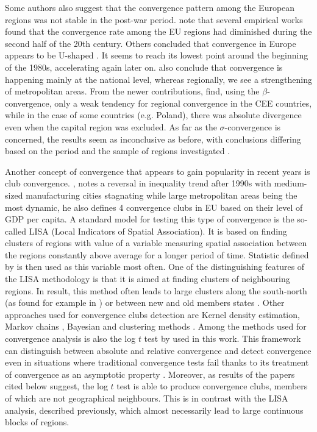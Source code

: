 \documentclass[11pt]{article}
\begin{document}
 Some authors also suggest that the convergence pattern among the European regions was not stable in the post-war period. \citet{eckey2007convergence} note that several empirical works found that the convergence rate among the EU regions had diminished during the second half of the 20th century. Others concluded that convergence in Europe appears to be U-shaped \citep{basile2001regional, geppert2008regional}. It seems to reach its lowest point around the beginning of the 1980s, accelerating again later on. \citet{geppert2008regional} also conclude that convergence is happening mainly at the national level, whereas regionally, we see a strengthening of metropolitan areas. From the newer contributions, \citet*{sme2012regional} find, using the $\beta$-convergence, only a weak tendency for regional convergence in the CEE countries, while in the case of some countries (e.g. Poland), there was absolute divergence even when the capital region was excluded. As far as the $\sigma$-convergence is concerned, the results seem as inconclusive as before, with conclusions differing based on the period and the sample of regions investigated \citep{eckey2007convergence}.
 
 Another concept of convergence that appears to gain popularity in recent years is club convergence. \citet{iammarino2017regional}, notes a reversal in inequality trend after 1990s with medium-sized manufacturing cities stagnating while large metropolitan areas being the most dynamic, he also defines 4 convergence clubs in EU based on their level of GDP per capita.  %
 A standard model for testing this type of convergence is the so-called LISA (Local Indicators of Spatial Association). It is based on finding clusters of regions with value of a variable measuring spatial association between the regions constantly above  average for a longer period of time. Statistic defined by \citet{getis1992analysis} is then used as this variable most often. One of the distinguishing features of the LISA methodology is that it is aimed at finding clusters of neighbouring regions. In result, this method often leads to large clusters along the south-north  (as found for example in \citet{baumont2003spatial}) or between new and old members states \citep{eckey2007convergence}. 
Other approaches used for convergence clubs detection are Kernel density estimation, Markov chains \citep{eckey2007convergence}, Bayesian \citep{fischer2015bayesian} and clustering methods \citep{maasoumi2008economic}. 
Among the methods used for convergence analysis is also the log $t$ test by \citet{phillips2007transition} used in this work. This framework can distinguish between absolute and relative convergence and detect convergence even in situations where traditional convergence tests fail thanks to its treatment of convergence as an asymptotic property \citep{bartkowska2012regional, borsi2015evolution}.
Moreover, as results of the papers cited below suggest, the log $t$ test is able to produce convergence clubs, members of which are not geographical neighbours. This is in contrast with the LISA analysis, described previously, which almost necessarily lead to large continuous blocks of regions.
\end{document}

